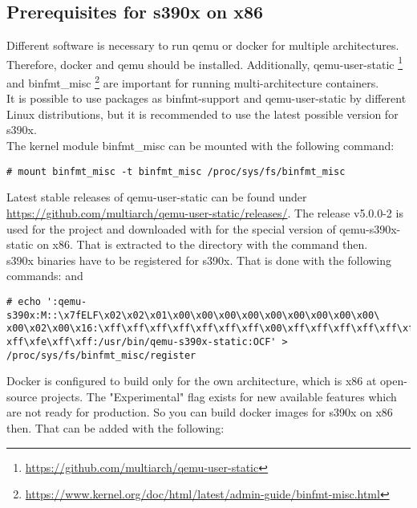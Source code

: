 \subsection{Prerequisites for s390x on x86}

Different software is necessary to run qemu or docker for multiple architectures. Therefore, docker and qemu should be installed. Additionally, qemu-user-static \footnote{\url{https://github.com/multiarch/qemu-user-static}} and binfmt\_misc \footnote{\url{https://www.kernel.org/doc/html/latest/admin-guide/binfmt-misc.html}} are important for running multi-architecture containers. \\

It is possible to use packages as binfmt-support and qemu-user-static by different Linux distributions, but it is recommended to use the latest possible version for s390x. \\

The kernel module binfmt\_misc can be mounted with the following command: 
\begin{lstlisting}[style=BashInputStyle]
  # mount binfmt_misc -t binfmt_misc /proc/sys/fs/binfmt_misc
\end{lstlisting}
Latest stable releases of qemu-user-static can be found under \url{https://github.com/multiarch/qemu-user-static/releases/}. The release v5.0.0-2 is used for the project and downloaded with  for the special version of qemu-s390x-static on x86. That is extracted to the directory  with the command  then. \\

s390x binaries have to be registered for s390x. That is done with the following commands:  and \begin{verbatim}
# echo ':qemu-s390x:M::\x7fELF\x02\x02\x01\x00\x00\x00\x00\x00\x00\x00\x00\x00\ 
x00\x02\x00\x16:\xff\xff\xff\xff\xff\xff\xff\x00\xff\xff\xff\xff\xff\xff\xff\xff\
xff\xfe\xff\xff:/usr/bin/qemu-s390x-static:OCF' > /proc/sys/fs/binfmt_misc/register
\end{verbatim}

Docker is configured to build only for the own architecture, which is x86 at open-source projects. The "Experimental" flag exists for new available features which are not ready for production. So you can build docker images for s390x on x86 then. That can be added with the following:

